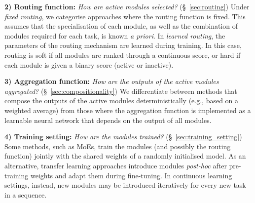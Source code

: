 \documentclass[10pt]{article} %
\begin{document}
\textbf{2) Routing function:} \textit{How are active modules selected?} (\S~\ref{sec:routing}) Under \textit{fixed routing}, we categorise approaches where the routing function is fixed. This assumes that the specialisation of each module, as well as the combination of modules required for each task, is known \textit{a priori}. In \textit{learned routing}, the parameters of the routing mechanism are learned during training. In this case, routing is soft if all modules are ranked through a continuous score, or hard if each module is given a binary score (active or inactive).

\textbf{3) Aggregation function:} \textit{How are the outputs of the active modules aggregated?} (\S~\ref{sec:compositionality}) We differentiate between methods that compose the outputs of the active modules deterministically (e.g., based on a weighted average) from those where the aggregation function is implemented as a learnable neural network that depends on the output of all modules.

\textbf{4) Training setting:} \textit{How are the modules trained?} (\S~\ref{sec:training_setting}) Some methods, such as MoEs, train the modules (and possibly the routing function) jointly with the shared weights of a randomly initialised model. As an alternative, transfer learning approaches introduce modules \textit{post-hoc} after pre-training weights and adapt them during fine-tuning. In continuous learning settings, instead, new modules may be introduced iteratively for every new task in a sequence.
\end{document}
